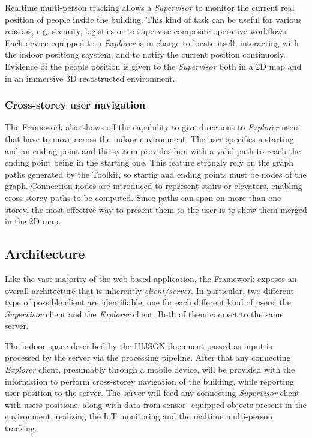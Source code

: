 Realtime multi-person tracking allows a \emph{Supervisor} to monitor the current
real position of people inside the building. This kind of task can be useful for
various reasons, e.g. security, logistics or to supervise composite operative
workflows. Each device equipped to a \emph{Explorer} is in charge to locate
itself, interacting with the indoor positiong saystem, and to notify the current
position continuosly. Evidence of the people position is given to the
\emph{Supervisor} both in a 2D map and in an immersive 3D recostructed
environment.

\subsubsection{Cross-storey user navigation}\label{cross-storey-user-navigation}

The Framework also shows off the capability to give directions to
\emph{Explorer} users that have to move across the indoor environment. The
user specifies a starting and an ending point and the system provides him with
a valid path to reach the ending point being in the starting one. This feature
strongly rely on the graph paths generated by the Toolkit, so startig and
ending points must be nodes of the graph. Connection nodes are introduced to
represent stairs or elevators, enabling cross-storey paths to be computed.
Since paths can span on more than one storey, the most effective way
to present them to the user is to show them merged in the 2D map.

\subsection{Architecture}\label{architecture}

Like the vast majority of the web based application, the Framework exposes an
overall architecture that is inherently \emph{client/server}. In particular,
two different type of possible client are identifiable, one for each different 
kind of users: the \emph{Supervisor} client and the \emph{Explorer} client. 
Both of them connect to the same server.

The indoor space described by the HIJSON document passed as input is
processed by the server via the processing pipeline. After that any connecting
\emph{Explorer} client, presumably through a mobile device, will be provided
with the information to perform cross-storey navigation of the building, while
reporting user position to the server. The server will feed any connecting
\emph{Supervisor} client with users positions, along with data from sensor-
equipped objects present in the environment, realizing the IoT monitoring and
the realtime multi-person tracking.

